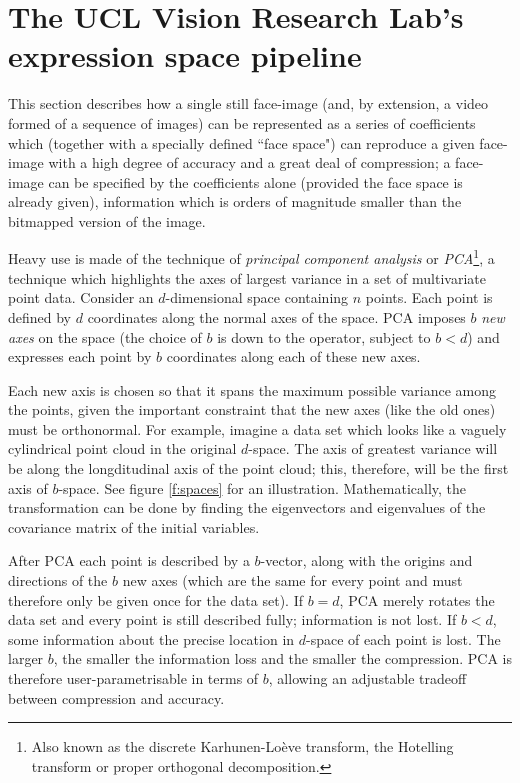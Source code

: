 \appendix
\onecolumn


\section{The UCL Vision Research Lab's expression space pipeline}
\label{a:pipeline}
This section describes how a single still face-image (and, by extension, a video formed of a sequence of images) can be represented as a series of coefficients which (together with a specially defined ``face space") can reproduce a given face-image with a high degree of accuracy and a great deal of compression; a face-image can be specified by the coefficients alone (provided the face space is already given), information which is orders of magnitude smaller than the bitmapped version of the image.

Heavy use is made of the technique of \textit{principal component analysis} or \textit{PCA}\cite{wood1987principal}\footnote{Also known as the discrete Karhunen-Lo\`eve transform, the Hotelling transform or proper orthogonal decomposition.}, a technique which highlights the axes of largest variance in a set of multivariate point data. Consider an $d$-dimensional space containing $n$ points. Each point is defined by $d$ coordinates along the normal axes of the space. PCA imposes $b$ \textit{new axes} on the space (the choice of $b$ is down to the operator, subject to $b<d$) and expresses each point by $b$ coordinates along each of these new axes.

Each new axis is chosen so that it spans the maximum possible variance among the points, given the important constraint that the new axes (like the old ones) must be orthonormal. For example, imagine a data set which looks like a vaguely cylindrical point cloud in the original $d$-space. The axis of greatest variance will be along the longditudinal axis of the point cloud; this, therefore, will be the first axis of $b$-space. See figure \ref{f:spaces} for an illustration. Mathematically, the transformation can be done by finding the eigenvectors and eigenvalues of the covariance matrix of the initial variables.

After PCA each point is described by a $b$-vector, along with the origins and directions of the $b$ new axes (which are the same for every point and must therefore only be given once for the data set).  If $b=d$, PCA merely rotates the data set and every point is still described fully; information is not lost. If $b<d$, some information about the precise location in $d$-space of each point is lost. The larger $b$, the smaller the information loss and the smaller the compression. PCA is therefore user-parametrisable in terms of $b$, allowing an adjustable tradeoff between compression and accuracy.


